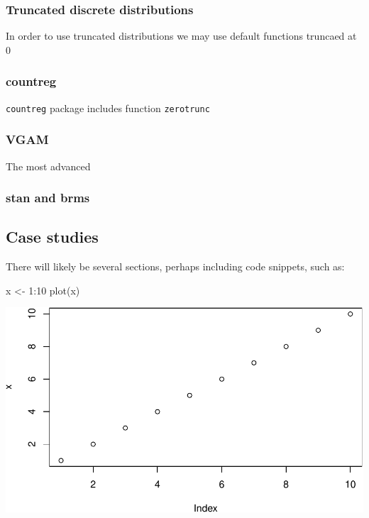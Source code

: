 \hypertarget{truncated-discrete-distributions}{%
\subsubsection{Truncated discrete
distributions}\label{truncated-discrete-distributions}}

In order to use truncated distributions we may use default functions
truncaed at 0

\hypertarget{countreg}{%
\subsubsection{countreg}\label{countreg}}

\texttt{countreg} package includes function \texttt{zerotrunc}

\hypertarget{vgam}{%
\subsubsection{VGAM}\label{vgam}}

The most advanced

\hypertarget{stan-and-brms}{%
\subsubsection{stan and brms}\label{stan-and-brms}}

\hypertarget{case-studies}{%
\subsection{Case studies}\label{case-studies}}

There will likely be several sections, perhaps including code snippets,
such as:

\begin{Schunk}
\begin{Sinput}
x <- 1:10
plot(x)
\end{Sinput}

\includegraphics{overview-single-source_files/figure-latex/unnamed-chunk-1-1} \end{Schunk}

